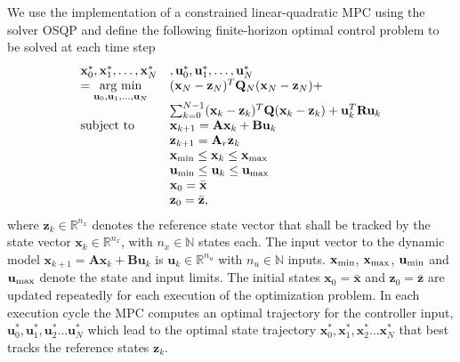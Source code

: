 We use the implementation of a constrained linear-quadratic MPC using the solver OSQP \cite{osqp} and define the following finite-horizon optimal control problem to be solved at each time step
\begin{equation}
\begin{split}
\begin{array}{ll}
\mathbf{x}^*_0,\mathbf{x}^*_1, \ldots, \mathbf{x}^*_{N}& ,\mathbf{u}^*_0,\mathbf{u}^*_1, \ldots, \mathbf{u}^*_{N} \\
 = \underset{\mathbf{u}_0,\mathbf{u}_1, \ldots, \mathbf{u}_{N}}{ \mbox{arg min} }  & (\mathbf{x}_N-\mathbf{z}_{N})^T \mathbf{Q}_N (\mathbf{x}_N-\mathbf{z}_{N}) +\\
  					 & \sum_{k=0}^{N-1} (\mathbf{x}_k-\mathbf{z}_{k})^T \mathbf{Q} (\mathbf{x}_k-\mathbf{z}_{k}) + \mathbf{u}_k^T \mathbf{R} \mathbf{u}_k \\
  \mbox{subject to} & \mathbf{x}_{k+1} = \mathbf{A} \mathbf{x}_k + \mathbf{B} \mathbf{u}_k \\
  					 & \mathbf{z}_{k+1} = \mathbf{A}_r \mathbf{z}_{k}  \\
                    & \mathbf{x}_{\rm min} \le \mathbf{x}_k  \le \mathbf{x}_{\rm max} \\
                    & \mathbf{u}_{\rm min} \le \mathbf{u}_k  \le \mathbf{u}_{\rm max} \\
                    & \mathbf{x}_0 = \bar{\mathbf{x}}\\
                    & \mathbf{z}_{0} =\bar{\mathbf{z}},
\end{array}
\end{split}\label{eq:MPC}
\end{equation} 
where $\mathbf{z}_{k}\in\mathbb{R}^{n_x}$ denotes the reference state vector that shall be tracked by the state vector  $\mathbf{x}_k\in\mathbb{R}^{n_x}$, with $n_x\in\mathbb{N}$ states each. The input vector to the dynamic model   $\mathbf{x}_{k+1} = \mathbf{A} \mathbf{x}_k + \mathbf{B} \mathbf{u}_k $ is  $\mathbf{u}_k\in\mathbb{R}^{n_u}$ with $n_u\in\mathbb{N}$ inputs.   $\mathbf{x}_{\rm min}$,  $\mathbf{x}_{\rm max}$, $\mathbf{u}_{\rm min}$ and $\mathbf{u}_{\rm max}$ denote the state and input limits. The initial states  $\mathbf{x}_0 = \bar{\mathbf{x}}$ and $\mathbf{z}_{0}= \bar{\mathbf{z}}$ are updated repeatedly for each execution of the optimization problem. In each execution cycle the MPC computes an optimal trajectory for the controller input, $\mathbf{u}^*_0,\mathbf{u}^*_1,\mathbf{u}^*_2 \ldots \mathbf{u}^*_{N} $ which lead to the optimal state trajectory  $\mathbf{x}^*_0,\mathbf{x}^*_1,\mathbf{x}^*_2 \ldots \mathbf{x}^*_{N} $ that best tracks the reference states $\mathbf{z}_k$. 
